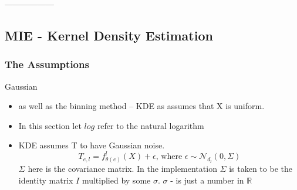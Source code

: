 \documentclass[dissertation.tex]{subfiles}
\begin{document}
------------------

\subsection{MIE - Kernel Density Estimation} \label{subKDE}
 
\subsubsection{The Assumptions}

Gaussian

\begin{itemize}
  \item{
      as well as the binning method -- KDE as assumes that X is uniform.
    }
  \item{
      In this section let $log$ refer to the natural logarithm
    }
  \item{
      KDE assumes T to have Gaussian noise.
      \begin{equation}
        T_{e,l} = f_{\theta(e)}^l(X) + \epsilon
        \text{, where }\epsilon\sim\mathcal{N}_{d_l}(0,\Sigma)
        \label{eqTwithNoise}
      \end{equation}
      $\Sigma$ here is the covariance matrix. In the implementation $\Sigma$ is
      taken to be the identity matrix $I$ multiplied by some $\sigma$. $\sigma$
      - is just a number in $\mathbb{R}$

}
\end{itemize}
\end{document}

